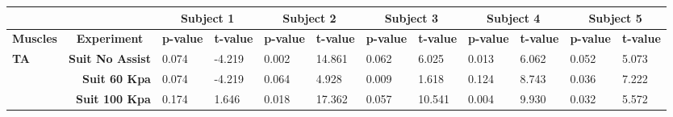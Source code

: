 \documentclass[letterpaper, 10 pt, conference]{ieeeconf}  %
\begin{document}
\begin{table*}[]
	\centering
	\begin{tabular}{@{}lrllllllllll@{}}
		\toprule
		\multicolumn{1}{c}{}                 &                                         & \multicolumn{2}{c}{\textbf{Subject 1}}                                      & \multicolumn{2}{c}{\textbf{Subject 2}}                                      & \multicolumn{2}{c}{\textbf{Subject 3}}                                      & \multicolumn{2}{c}{\textbf{Subject 4}}                                      & \multicolumn{2}{c}{\textbf{Subject 5}}                                      \\ \midrule
		\multicolumn{1}{c}{\textbf{Muscles}} & \multicolumn{1}{c}{\textbf{Experiment}} & \multicolumn{1}{c}{\textbf{p-value}} & \multicolumn{1}{c}{\textbf{t-value}} & \multicolumn{1}{c}{\textbf{p-value}} & \multicolumn{1}{c}{\textbf{t-value}} & \multicolumn{1}{c}{\textbf{p-value}} & \multicolumn{1}{c}{\textbf{t-value}} & \multicolumn{1}{c}{\textbf{p-value}} & \multicolumn{1}{c}{\textbf{t-value}} & \multicolumn{1}{c}{\textbf{p-value}} & \multicolumn{1}{c}{\textbf{t-value}} \\ \midrule
		\textbf{TA}                          & \textbf{Suit No Assist}                 & 0.074                                & -4.219                               & 0.002                                & 14.861                               & 0.062                                & 6.025                                & 0.013                                & 6.062                                & 0.052                                & 5.073                                \\
		\textbf{}                            & \textbf{Suit 60 Kpa}                    & 0.074                                & -4.219                               & 0.064                                & 4.928                                & 0.009                                & 1.618                                & 0.124                                & 8.743                                & 0.036                                & 7.222                                \\
		\textbf{}                            & \textbf{Suit 100 Kpa}                   & 0.174                                & 1.646                                & 0.018                                & 17.362                               & 0.057                                & 10.541                               & 0.004                                & 9.930                                & 0.032                                & 5.572                                \\ \midrule

\end{tabular}
\end{table*}
\end{document}
